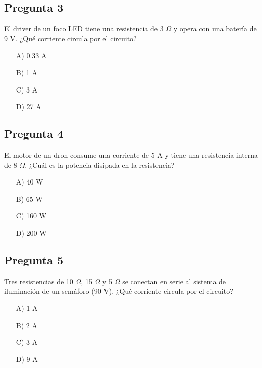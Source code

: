 \begin{preguntabox}
\subsection{Pregunta 3}
El driver de un foco LED tiene una resistencia de 3 $\Omega$ y opera con una batería de 9 V. ¿Qué corriente circula por el circuito?

\begin{enumerate}
    \item[A)] 0.33 A
    \item[B)] 1 A
    \item[C)] 3 A
    \item[D)] 27 A
\end{enumerate}
\end{preguntabox}

\begin{preguntabox}
\subsection{Pregunta 4}
El motor de un dron consume una corriente de 5 A y tiene una resistencia interna de 8 $\Omega$. ¿Cuál es la potencia disipada en la resistencia?

\begin{enumerate}
    \item[A)] 40 W
    \item[B)] 65 W
    \item[C)] 160 W
    \item[D)] 200 W
\end{enumerate}
\end{preguntabox}

\begin{preguntabox}
\subsection{Pregunta 5}
Tres resistencias de 10 $\Omega$, 15 $\Omega$ y 5 $\Omega$ se conectan en serie al sistema de iluminación de un semáforo (90 V). ¿Qué corriente circula por el circuito?

\begin{enumerate}
    \item[A)] 1 A
    \item[B)] 2 A
    \item[C)] 3 A
    \item[D)] 9 A
\end{enumerate}
\end{preguntabox}

